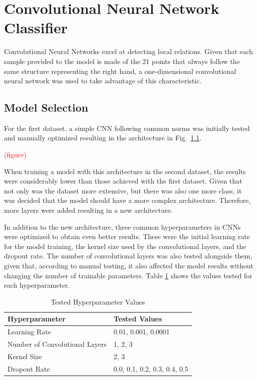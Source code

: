 \section{Convolutional Neural Network Classifier}

Convolutional Neural Networks excel at detecting local relations. Given that each sample provided to the model is made of the 21 points that always follow the same structure representing the right hand, a one-dimensional convolutional neural network was used to take advantage of this characteristic.

\subsection{Model Selection}

For the first dataset, a simple CNN following common norms was initially tested and manually optimized resulting in the architecture in Fig.~\ref{}.

\textcolor{red}{(figure)}

When training a model with this architecture in the second dataset, the results were considerably lower than those achieved with the first dataset. Given that not only was the dataset more extensive, but there was also one more class, it was decided that the model should have a more complex architecture. Therefore, more layers were added resulting in a new architecture.

In addition to the new architecture, three common hyperparameters in CNNs were optimized to obtain even better results. These were the initial learning rate for the model training, the kernel size used by the convolutional layers, and the dropout rate. The number of convolutional layers was also tested alongside them, given that, according to manual testing, it also affected the model results without changing the number of trainable parameters. Table \ref{table:cnn_hyperparameters} shows the values tested for each hyperparameter.

\begin{table}[H]
    \centering
    \caption{Tested Hyperparameter Values}
    \label{table:cnn_hyperparameters}
    \begin{tabular}{|l|l|}
        \hline
        Hyperparameter & Tested Values \\
        \hline
        Learning Rate & 0.01, 0.001, 0.0001 \\
        \hline
        Number of Convolutional Layers & 1, 2, 3 \\
        \hline
        Kernel Size & 2, 3 \\
        \hline
        Dropout Rate & 0.0, 0.1, 0.2, 0.3, 0.4, 0.5 \\
        \hline
    \end{tabular}
\end{table}

